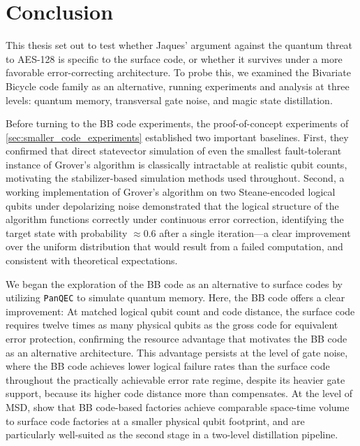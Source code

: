 \chapter{Conclusion}\label{chap:conclusion}
This thesis set out to test whether Jaques' argument against the quantum threat to AES-128 is specific to the surface code, or whether it survives under a more favorable error-correcting architecture. To probe this, we examined the Bivariate Bicycle code family as an alternative, running experiments and analysis at three levels: quantum memory, transversal gate noise, and magic state distillation.

Before turning to the BB code experiments, the proof-of-concept experiments of \cref{sec:smaller_code_experiments} established two important baselines. First, they confirmed that direct statevector simulation of even the smallest fault-tolerant instance of Grover's algorithm is classically intractable at realistic qubit counts, motivating the stabilizer-based simulation methods used throughout. Second, a working implementation of Grover's algorithm on two Steane-encoded logical qubits under depolarizing noise demonstrated that the logical structure of the algorithm functions correctly under continuous error correction, identifying the target state with probability $\approx 0.6$ after a single iteration---a clear improvement over the uniform distribution that would result from a failed computation, and consistent with theoretical expectations.

We began the exploration of the BB code as an alternative to surface codes by utilizing \texttt{PanQEC} to simulate quantum memory. Here, the BB code offers a clear improvement: At matched logical qubit count and code distance, the surface code requires twelve times as many physical qubits as the gross code for equivalent error protection, confirming the resource advantage that motivates the BB code as an alternative architecture. This advantage persists at the level of gate noise, where the BB code achieves lower logical failure rates than the surface code throughout the practically achievable error rate regime, despite its heavier gate support, because its higher code distance more than compensates. At the level of MSD, \textcite{Xu_2026} show that BB code-based factories achieve comparable space-time volume to surface code factories at a smaller physical qubit footprint, and are particularly well-suited as the second stage in a two-level distillation pipeline.

